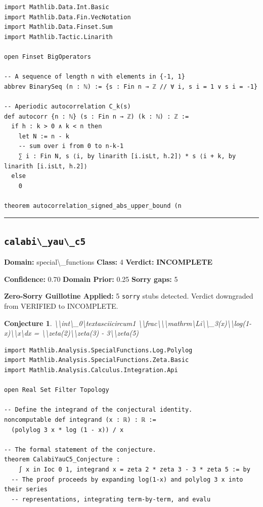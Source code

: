 \documentclass[12pt,a4paper]{article}
\newtheorem{conjecture}{Conjecture}
\begin{document}
\begin{lstlisting}[caption={Lean 4 Sketch (v14 Galois)}]
import Mathlib.Data.Int.Basic
import Mathlib.Data.Fin.VecNotation
import Mathlib.Data.Finset.Sum
import Mathlib.Tactic.Linarith

open Finset BigOperators

-- A sequence of length n with elements in {-1, 1}
abbrev BinarySeq (n : ℕ) := {s : Fin n → ℤ // ∀ i, s i = 1 ∨ s i = -1}

-- Aperiodic autocorrelation C_k(s)
def autocorr {n : ℕ} (s : Fin n → ℤ) (k : ℕ) : ℤ := 
  if h : k > 0 ∧ k < n then
    let N := n - k
    -- sum over i from 0 to n-k-1
    ∑ i : Fin N, s ⟨i, by linarith [i.isLt, h.2]⟩ * s ⟨i + k, by linarith [i.isLt, h.2]⟩
  else
    0

theorem autocorrelation_signed_abs_upper_bound (n
\end{lstlisting}

\hrule\medskip

\subsection*{\texttt{calabi\textbackslash{}_yau\textbackslash{}_c5}}

\textbf{Domain:} special\textbackslash{}_functions \quad \textbf{Class:} 4 \quad \textbf{Verdict:} \textcolor{incompleteamber}{\textbf{INCOMPLETE}}

\textbf{Confidence:} 0.70 \quad \textbf{Domain Prior:} 0.25 \quad \textbf{Sorry gaps:} 5

\textcolor{sorryred}{\textbf{Zero-Sorry Guillotine Applied:} 5 \texttt{sorry} stubs detected. Verdict downgraded from VERIFIED to INCOMPLETE.}

\begin{conjecture}
\textbackslash{}\textbackslash{}int\textbackslash{}_0\textbackslash{}textasciicircum{}1 \textbackslash{}\textbackslash{}frac\textbackslash{}{\textbackslash{}\textbackslash{}mathrm\textbackslash{}{Li\textbackslash{}}\textbackslash{}_3(x)\textbackslash{}\textbackslash{}log(1-x)\textbackslash{}}\textbackslash{}{x\textbackslash{}}dx = \textbackslash{}\textbackslash{}zeta(2)\textbackslash{}\textbackslash{}zeta(3) - 3\textbackslash{}\textbackslash{}zeta(5)
\end{conjecture}

\begin{lstlisting}[caption={Lean 4 Sketch (v14 Galois)}]
import Mathlib.Analysis.SpecialFunctions.Log.Polylog
import Mathlib.Analysis.SpecialFunctions.Zeta.Basic
import Mathlib.Analysis.Calculus.Integration.Api

open Real Set Filter Topology

-- Define the integrand of the conjectural identity.
noncomputable def integrand (x : ℝ) : ℝ :=
  (polylog 3 x * log (1 - x)) / x

-- The formal statement of the conjecture.
theorem CalabiYauC5_Conjecture : 
    ∫ x in Ioc 0 1, integrand x = zeta 2 * zeta 3 - 3 * zeta 5 := by
  -- The proof proceeds by expanding log(1-x) and polylog 3 x into their series
  -- representations, integrating term-by-term, and evalu
\end{lstlisting}
\end{document}
